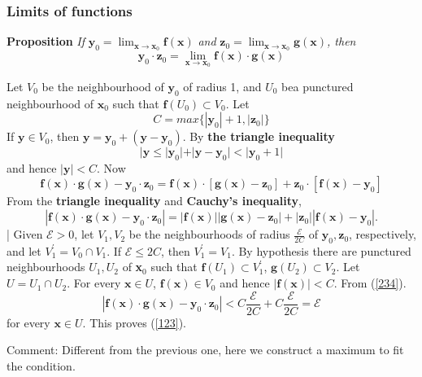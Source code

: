 \documentclass[titlepage,a4paper,12pt]{article}
\theoremstyle{nonumberplain}
\newtheorem{Proof}{\hskip 2em Proof}
\begin{document}
\subsubsection{Limits of functions}
\textbf{Proposition} \emph{If} $\textbf{y}_0=\lim_{\textbf{x}\to\textbf{x}_0}\textbf{f}(\textbf{x})$ \emph{and} $\textbf{z}_0=\lim_{\textbf{x}\to\textbf{x}_0}\textbf{g}(\textbf{x})$\emph{, then}
\begin{equation}
\textbf{y}_0 \cdot \textbf{z}_0= \lim_{\textbf{x}\to\textbf{x}_0}\textbf{f}(\textbf{x})\cdot \textbf{g}(\textbf{x})
\tag{*}
\label{123}
\end{equation}
\begin{Proof}
Let $V_0$ be the neighbourhood of $\textbf{y}_0$ of radius 1, and $U_0$ bea punctured neighbourhood of $\textbf{x}_0$ such that $\textbf{f}(U_0)\subset V_0$. Let
$$C=max\{|\textbf{y}_0|+1,|\textbf{z}_0|\}$$
If $\textbf{y}\in V_0$, then $\textbf{y}=\textbf{y}_0+(\textbf{y}-\textbf{y}_0)$. By \textbf{the triangle inequality}
$$|\textbf{y}\leq |\textbf{y}_0|+|\textbf{y}-\textbf{y}_0|<|\textbf{y}_0+1|$$
and hence $|\textbf{y}|<C$. Now
$$\textbf{f}(\textbf{x})\cdot\textbf{g}(\textbf{x})-\textbf{y}_0\cdot\textbf{z}_0=\textbf{f}(\textbf{x})\cdot[\textbf{g}(\textbf{x})-\textbf{z}_0]+\textbf{z}_0\cdot[\textbf{f}(\textbf{x})-\textbf{y}_0]$$
From the \textbf{triangle inequality} and \textbf{Cauchy's inequality},
\begin{equation}
|\textbf{f}(\textbf{x})\cdot\textbf{g}(\textbf{x})-\textbf{y}_0\cdot\textbf{z}_0|=|\textbf{f}(\textbf{x})||\textbf{g}(\textbf{x})-\textbf{z}_0|+|\textbf{z}_0||\textbf{f}(\textbf{x})-\textbf{y}_0|.
\label{234}
\end{equation}|
Given $\mathcal{E}>0$, let $V_1,V_2$ be the neighbourhoods of radius $\frac{\mathcal{E}}{2C}$ of $\textbf{y}_0,\textbf{z}_0$, respectively, and let $V_1^{'}=V_0\cap V_1$. If $\mathcal{E}\leq 2C$, then $V_1^{'}=V_1$. By hypothesis there are punctured neighbourhoods $U_1,U_2$ of \textbf{x}$_0$ such that $\textbf{f}(U_1)\subset V_1^{'}$, $\textbf{g}(U_2)\subset V_2$. Let $U=U_1\cap U_2$. For every $\textbf{x}\in U$, $\textbf{f}(\textbf{x})\in V_0$ and hence $|\textbf{f}(\textbf{x})|<C$. From (\ref{234}).
$$|\textbf{f}(\textbf{x})\cdot\textbf{g}(\textbf{x})-\textbf{y}_0\cdot\textbf{z}_0|<C\frac{\mathcal{E}}{2C}+C\frac{\mathcal{E}}{2C}=\mathcal{E}$$
for every $\textbf{x}\in U$. This proves (\ref{123}).
\end{Proof}
Comment: Different from the previous one, here we construct a maximum to fit the condition.
\end{document}
